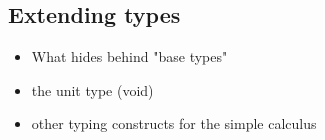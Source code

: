 \subsection{Extending types}

\begin{itemize}
    \item What hides behind "base types"
    \item the unit type (void)
    \item other typing constructs for the simple calculus
\end{itemize}
